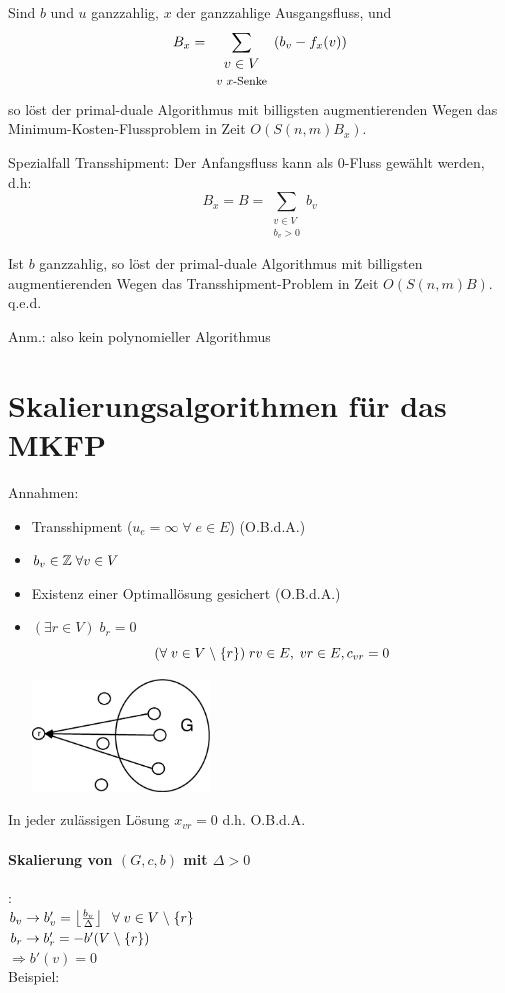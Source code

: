 \begin{satz}
Sind $b$ und $u$ ganzzahlig, $x$ der ganzzahlige Ausgangsfluss, und
\[B_{x} = \sum_{\begin{array}{c}v \in V\\\mbox{\footnotesize $v$ $x$-Senke}\end{array}
} (b_{v} - f_{x}(v))\]
so löst der primal-duale Algorithmus mit billigsten augmentierenden Wegen
das Minimum-Kosten-Flussproblem  in Zeit $O(S(n,m)B_{x})$.

Spezialfall Transshipment: Der Anfangsfluss kann als 0-Fluss gewählt
werden, d.h:
\[B_{x} = B = \sum_{\begin{array}{c}v \in V\\b_{v} > 0\end{array}} b_{v}\]
\end{satz}

\begin{lemma}
Ist $b$ ganzzahlig, so löst der primal-duale Algorithmus mit billigsten
augmentierenden Wegen das Transshipment-Problem in Zeit $O(S(n,m)B)$.
q.e.d.
\end{lemma}
Anm.: also kein polynomieller Algorithmus

\section{Skalierungsalgorithmen für das MKFP}
Annahmen:
\begin{itemize}
\item Transshipment ($u_{e} = \infty \; \forall \; e \in E$) (O.B.d.A.)
\item $b_{v} \in \mathbb{Z} \; \forall v \in V$
\item Existenz einer Optimallösung gesichert (O.B.d.A.)
\item $(\exists r \in V) \; b_{r} = 0$
\[(\forall \; v \in V \;\backslash\; \{r\}) \; r v \in E, \; v r \in E, c_{v r} = 0\]

\includegraphics[height=3cm]{bilder/4-4Skalierung1}
\end{itemize}
In jeder zulässigen Lösung $x_{v r} = 0$ d.h. O.B.d.A.

\paragraph{Skalierung von $(G,c,b)$ mit $\Delta >0$}:\\
$b_{v} \rightarrow b'_{v} = \left\lfloor \frac{b_{v}}{\Delta}\right\rfloor
\; \; \forall \; v \in V \;\backslash\; \{r\}$\\
$b_{r} \rightarrow b'_{r} = - b'(V \;\backslash\; \{r\})$\\
$\Rightarrow b'(v) = 0$\\
Beispiel:

